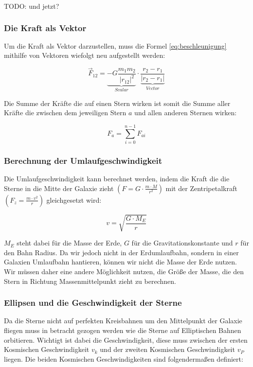 TODO: und jetzt?

\subsubsection{Die Kraft als Vektor}
Um die Kraft als Vektor darzustellen, muss die Formel \ref{eq:beschleunigung}
mithilfe von Vektoren wiefolgt neu aufgestellt werden:

\begin{equation} \vec{F}_{12} = \underbrace{-G \frac{m_1 m_2}{|r_{12}|^2}}_{Scalar}
\cdot \underbrace{\frac{r_2 - r_1}{|r_2 - r_1|}}_{Vector} \end{equation}

Die Summe der Kräfte die auf einen Stern wirken ist somit die Summe aller
Kräfte die zwischen dem jeweiligen Stern \( a \) und allen anderen Sternen
wirken:

\begin{equation} F_{a} = \sum_{i=0}^{n-1} F_{ai} \end{equation}

\subsubsection{Berechnung der Umlaufgeschwindigkeit}
Die Umlaufgeschwindigkeit kann berechnet werden, indem die Kraft die die Sterne
in die Mitte der Galaxie zieht \( \left( F = G \cdot \frac{m \cdot M}{r^2}
\right) \) mit der Zentripetalkraft \( \left( F_z = \frac{m \cdot v^2}{r}
\right)\) gleichgesetzt wird:

\begin{equation}
v = \sqrt{\frac{G \cdot M_E}{r}}
\end{equation}

\( M_E \) steht dabei für die Masse der Erde, \( G \) für die
Gravitationskonstante und \( r \) für den Bahn Radius.  Da wir jedoch nicht in
der Erdumlaufbahn, sondern in einer Galaxien Umlaufbahn hantieren, können wir
nicht die Masse der Erde nutzen. Wir müssen daher eine andere Möglichkeit
nutzen, die Größe der Masse, die den Stern in Richtung Massenmittelpunkt zieht zu
berechnen.

\subsubsection{Ellipsen und die Geschwindigkeit der Sterne}
Da die Sterne nicht auf perfekten Kreisbahnen um den Mittelpunkt der Galaxie
fliegen muss in betracht gezogen werden wie die Sterne auf Elliptischen Bahnen
orbitieren.  Wichtigt ist dabei die Geschwindigkeit, diese muss zwischen der
ersten Kosmischen Geschwindigkeit \( v_k \) und der zweiten Kosmischen
Geschwindigkeit \( v_P \) liegen. Die beiden Kosmischen Geschwindigkeiten sind
folgendermaßen definiert:

